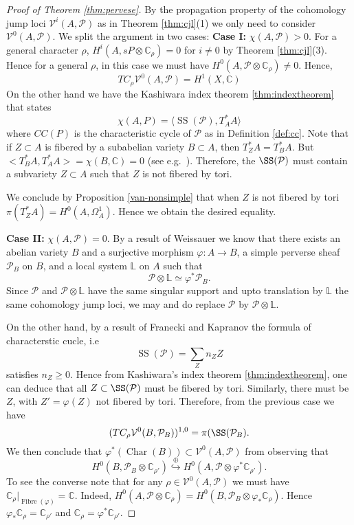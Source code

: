 \documentclass[12pt,reqno]{amsart}
\theoremstyle{question}
\theoremstyle{definition}
\theoremstyle{remark}
\theoremstyle{cited}
\theoremstyle{citeddef}
\DeclareMathOperator{\Char}{Char}
\DeclareMathOperator{\CC}{SS}
\newcommand{\sP}{\mathcal{P}}
\newcommand\sV{{\mathcal V}}
\newcommand{\bbC}{\mathbb{C}}
\newcommand{\bbL}{\mathbb{L}}
\newcommand{\into}{\hookrightarrow}
\begin{document}
\begin{proof}[Proof of Theorem \ref{thm:pervese}]
By the propagation property of the cohomology jump loci
$\sV^i(A, \sP)$ as in Theorem \ref{thm:cjl}(1) we
only need to consider $\sV^0(A,\sP)$. We split the argument in 
two cases:
\noindent \textbf{Case I: }$\chi(A, \sP)>0$. 
For a general character $\rho$, $H^i(A, sP\otimes \bbC_{\rho})= 0$ for $i\neq 0$ by Theorem \ref{thm:cjl}(3). Hence for a general
$\rho$,
in this case we must have $H^0(A, \sP\otimes \bbC_{\rho})\neq 0$. Hence, 
\[TC_{\rho}\sV^0(A, \sP) = H^1(X,\bbC)\]
On the other hand we have
the Kashiwara index theorem \ref{thm:indextheorem}
that states
\[\chi(A,P) = \langle \CC(\sP), T^*_AA\rangle\]
where $CC(P)$ is the characteristic cycle of $\sP$ as
in Definition \ref{def:cc}.
Note that if $Z\subset A$ is fibered by a subabelian variety $B\subset A$, then $T^*_ZA = T^*_BA$. But $<T^*_BA, T^*_AA> = \chi(B, \bbC) = 0$ (see e.g.\ \cite[p.\ 124]{Dim}).  Therefore,
the $\SS(\sP)$ must contain a subvariety $Z\subset A$ such that
$Z$ is not fibered by tori. 

We conclude by Proposition \ref{van-nonsimple} that when $Z$ is not fibered by tori $\pi(T^*_ZA) = H^0(A,\Omega_A^1)$. Hence
we obtain the desired equality.

\noindent \textbf{Case II: } $\chi(A, \sP)=0$. 
By a result of Weissauer \cite[Theorem 2]{Wei}
we know that there exists an abelian variety $B$ and a surjective morphism $\varphi\colon A\to B$, a simple perverse sheaf $\sP_B$ on $B$, and a local system $\bbL$ on $A$
such that 
\[\sP\otimes \bbL\simeq \varphi^*\sP_B.\]
Since $\sP$ and $\sP\otimes \bbL$ have the same singular support
and upto translation by $\bbL$ the same cohomology jump loci, we 
may and do replace $\sP$ by $\sP\otimes \bbL$.

On the other hand, by a result of
Franecki and Kapranov
\cite[Corollary 1.4]{FK} the formula of
characterstic cucle, i.e\ \[\CC(\sP) = \sum_Z n_Z Z\]
satisfies $n_Z\geq 0$. Hence from Kashiwara's index theorem 
\ref{thm:indextheorem}, one can deduce that all $Z\subset \SS(\sP)$ must be fibered by tori. Similarly, there must be 
$Z$, with $Z' = \varphi(Z)$ not fibered by tori.
Therefore, from the previous case we have 
\[(TC_{\rho}\sV^0(B, \sP_B))^{1,0} = \pi(\SS(\sP_B).\]
We then conclude 
that $\varphi^*(\Char(B))\subset \sV^0(A, \sP)$ from observing that
\[H^0(B, \sP_B\otimes \bbC_{\rho'}) \overset{\oplus}{\into}
H^0(A, \sP\otimes \varphi^*\bbC_{\rho'}).\]
To see the converse note that 
for any $\rho \in \sV^0(A, \sP)$ we must 
have $\bbC_{\rho}|_{\operatorname{Fibre}(\varphi)} = \bbC$.
Indeed, $H^0(A, \sP\otimes \bbC_{\rho}) = H^0(B, \sP_B\otimes \varphi_*\bbC_{\rho})$.
Hence $\varphi_*\bbC_{\rho} = \bbC_{\rho'}$ and $\bbC_{\rho} = 
\varphi^*\bbC_{\rho'}$.







\end{proof}
\end{document}

